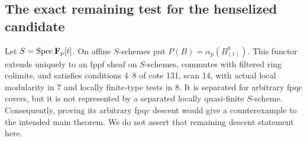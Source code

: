 \subsection{The exact remaining test for the henselized candidate}

\begin{proposition}\label{A:hensel-remaining-gate}
Let $S=\operatorname{Spec}\mathbf F_p[t]$. On affine $S$-schemes put
$P(B)=\alpha_p(B^h_{(t)})$. This functor extends uniquely to an
fppf sheaf on $S$-schemes, commutes with filtered ring colimits,
and satisfies conditions 4--8 of cote 131, scan 14, with actual
local modularity in 7 and locally finite-type tests in 8.
It is separated for arbitrary fpqc covers, but it is not represented
by a separated locally quasi-finite $S$-scheme.
Consequently, proving its arbitrary fpqc descent would give a
counterexample to the intended main theorem. We do not assert that
remaining descent statement here.
\end{proposition}
